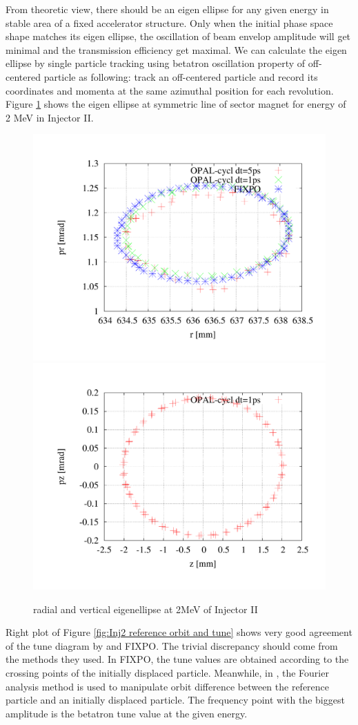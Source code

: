 From theoretic view, there should be an eigen ellipse for any given energy in stable area of a fixed accelerator structure. Only when the initial phase space
shape matches its eigen ellipse, the oscillation of beam envelop amplitude will get minimal and the transmission efficiency get maximal.
We can calculate the eigen ellipse by single particle tracking using betatron oscillation property of off-centered particle as following: track 
an off-centered particle and record its coordinates and momenta at the same azimuthal position for each revolution.    
Figure \ref{fig:eigen} shows the eigen ellipse at symmetric line of sector magnet for energy of 2 MeV in Injector II.
\begin{figure}[ht]
 \begin{center} 
   \includegraphics[width=0.45\linewidth,angle=0]{figures/cyclotron/RadialEigen_Inj2}
   \includegraphics[width=0.45\linewidth,angle=0]{figures/cyclotron/VertEigen_Inj2}
   \caption{radial and vertical eigenellipse at 2MeV of Injector II}   
   \label{fig:eigen}
 \end{center}
\end{figure}
 
Right plot of Figure \ref{fig:Inj2 reference orbit and tune} shows very good agreement of the tune diagram by \opalcycl and FIXPO.
The trivial discrepancy should come from the methods they used.
In FIXPO, the tune values are obtained according to the crossing points of the initially displaced particle. Meanwhile, in \opalcycl, the Fourier 
analysis method is used to manipulate orbit difference between the reference particle and an initially displaced particle.
The frequency point with the biggest amplitude is the betatron tune value at the given energy.

